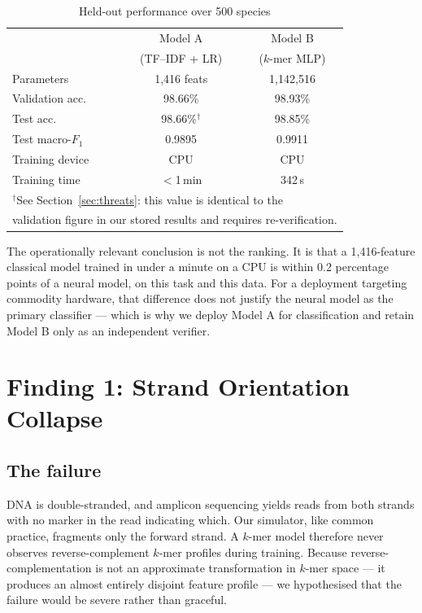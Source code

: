 \documentclass[conference]{IEEEtran}
\begin{document}
\begin{table}[t]
\caption{Held-out performance over 500 species}
\label{tab:models}
\centering
\begin{tabular}{lcc}
\toprule
 & Model A & Model B \\
 & (TF--IDF + LR) & ($k$-mer MLP) \\
\midrule
Parameters        & 1{,}416 feats & 1{,}142{,}516 \\
Validation acc.   & 98.66\% & 98.93\% \\
Test acc.         & 98.66\%$^{\dagger}$ & 98.85\% \\
Test macro-$F_1$  & 0.9895 & 0.9911 \\
Training device   & CPU & CPU \\
Training time     & $<$1\,min & 342\,s \\
\bottomrule
\multicolumn{3}{l}{\footnotesize $^{\dagger}$See Section~\ref{sec:threats}:
this value is identical to the}\\
\multicolumn{3}{l}{\footnotesize validation figure in our stored results and
requires re-verification.}\\
\end{tabular}
\end{table}

The operationally relevant conclusion is not the ranking. It is that a
1{,}416-feature classical model trained in under a minute on a CPU is within
0.2 percentage points of a neural model, on this task and this data. For a
deployment targeting commodity hardware, that difference does not justify
the neural model as the primary classifier --- which is why we deploy Model A
for classification and retain Model B only as an independent verifier.

\section{Finding 1: Strand Orientation Collapse}
\label{sec:strand}

\subsection{The failure}
DNA is double-stranded, and amplicon sequencing yields reads from both
strands with no marker in the read indicating which. Our simulator, like
common practice, fragments only the forward strand. A $k$-mer model
therefore never observes reverse-complement $k$-mer profiles during
training. Because reverse-complementation is not an approximate
transformation in $k$-mer space --- it produces an almost entirely disjoint
feature profile --- we hypothesised that the failure would be severe rather
than graceful.
\end{document}
